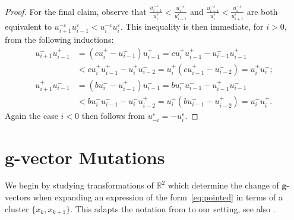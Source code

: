 \documentclass[pdflatex,sn-mathphys]{sn-jnl}%
\theoremstyle{thmstyleone}%
\theoremstyle{thmstyletwo}%
\theoremstyle{thmstylethree}%
\newcommand{\bfg}{\boldsymbol{g}}
\newcommand{\RR}{\mathbb{R}}
\begin{document}
\begin{proof}
    For the final claim, observe that $\frac{u_{i+1}^{-\varepsilon}}{u_i^\varepsilon}<\frac{u_i^{-\varepsilon}}{u_{i-1}^\varepsilon}$ and $\frac{u_{i-1}^{-\varepsilon}}{u_i^\varepsilon}<\frac{u_i^{-\varepsilon}}{u_{i+1}^\varepsilon}$ are both equivalent to $u_{i+1}^{-\varepsilon}u_{i-1}^\varepsilon<u_i^{-\varepsilon}u_i^\varepsilon$.
    This inequality is then immediate, for $i>0$, from the following inductions:
    \begin{align*}
      u_{i+1}^{-}u_{i-1}^+
      &=(cu_i^+-u_{i-1}^{-})u_{i-1}^+
      =cu_i^+ u_{i-1}^+-u_{i-1}^{-} u_{i-1}^+\\
      &<cu_i^+ u_{i-1}^+-u_i^+ u_{i-2}^{-}
      =u_i^+(cu_{i-1}^+-u_{i-2}^{-})
      =u_i^+ u_i^{-};
      \\
      u_{i+1}^{+}u_{i-1}^-
      &=(bu_i^--u_{i-1}^{+})u_{i-1}^-
      =bu_i^- u_{i-1}^--u_{i-1}^{+} u_{i-1}^-\\
      &<bu_i^- u_{i-1}^--u_i^- u_{i-2}^{+}
      =u_i^-(bu_{i-1}^--u_{i-2}^{+})
      =u_i^- u_i^{+}.
    \end{align*}
    Again the case $i<0$ then follows from $u_{-i}^\varepsilon=-u_i^\varepsilon$.
  \end{proof}


\section{$\bfg$-vector Mutations}
\label{sec:tropical}

  We begin by studying transformations of $\RR^2$ which determine the change of $\bfg$-vectors when expanding an expression of the form~\eqref{eq:pointed} in terms of a cluster $\{x_k,x_{k+1}\}$.
  This adapts the notation from \cite[Definition 2.1.4]{Qin19} to our setting, see also \cite[Definition 4.1]{Rea14}.
\end{document}
